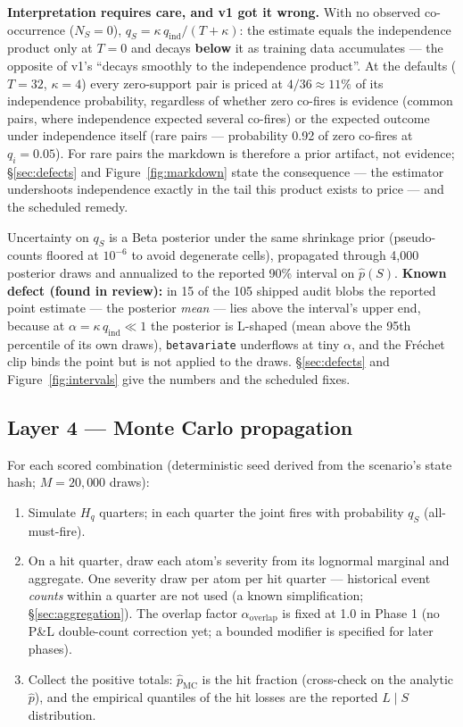 \documentclass[11pt]{article}
\begin{document}
\textbf{Interpretation requires care, and v1 got it wrong.} With no observed
co-occurrence ($N_S = 0$), $q_S = \kappa\, q_{\mathrm{ind}}/(T+\kappa)$: the
estimate equals the independence product only at $T = 0$ and decays
\textbf{below} it as training data accumulates --- the opposite of v1's
``decays smoothly to the independence product''. At the defaults ($T = 32$,
$\kappa = 4$) every zero-support pair is priced at $4/36 \approx 11\%$ of
its independence probability, regardless of whether zero co-fires is
evidence (common pairs, where independence expected several co-fires) or the
expected outcome under independence itself (rare pairs --- probability 0.92
of zero co-fires at $q_i = 0.05$). For rare pairs the markdown is therefore
a prior artifact, not evidence; \S\ref{sec:defects} and
Figure~\ref{fig:markdown} state the consequence --- the estimator
undershoots independence exactly in the tail this product exists to price
--- and the scheduled remedy.

Uncertainty on $q_S$ is a Beta posterior under the same shrinkage prior
(pseudo-counts floored at $10^{-6}$ to avoid degenerate cells), propagated
through 4{,}000 posterior draws and annualized to the reported 90\% interval
on $\hat p(S)$. \textbf{Known defect (found in review):} in 15 of the 105
shipped audit blobs the reported point estimate --- the posterior
\emph{mean} --- lies above the interval's upper end, because at
$\alpha = \kappa\, q_{\mathrm{ind}} \ll 1$ the posterior is L-shaped (mean
above the 95th percentile of its own draws), \texttt{betavariate} underflows
at tiny $\alpha$, and the Fr\'echet clip binds the point but is not applied
to the draws. \S\ref{sec:defects} and Figure~\ref{fig:intervals} give the
numbers and the scheduled fixes.

\subsection{Layer 4 --- Monte Carlo propagation}
\label{sec:mc}

For each scored combination (deterministic seed derived from the scenario's
state hash; $M = 20{,}000$ draws):

\begin{enumerate}[leftmargin=1.6em]
\item Simulate $H_q$ quarters; in each quarter the joint fires with
  probability $q_S$ (all-must-fire).
\item On a hit quarter, draw each atom's severity from its lognormal
  marginal and aggregate. One severity draw per atom per hit quarter ---
  historical event \emph{counts} within a quarter are not used (a known
  simplification; \S\ref{sec:aggregation}). The overlap factor
  $\alpha_{\mathrm{overlap}}$ is fixed at 1.0 in Phase 1 (no P\&L
  double-count correction yet; a bounded modifier is specified for later
  phases).
\item Collect the positive totals: $\hat p_{\mathrm{MC}}$ is the hit
  fraction (cross-check on the analytic $\hat p$), and the empirical
  quantiles of the hit losses are the reported $L \mid S$ distribution.
\end{enumerate}
\end{document}

